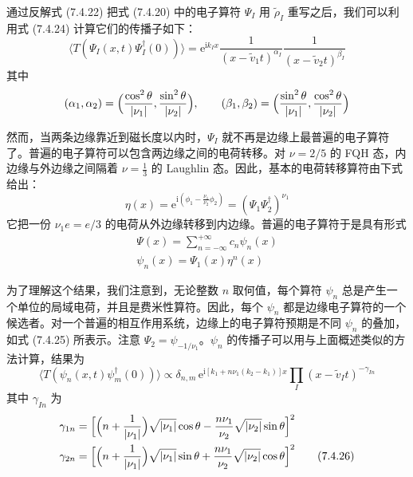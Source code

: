 通过反解式 (7.4.22) 把式 (7.4.20) 中的电子算符 $\Psi_I$ 用 $\tilde{\rho}_I$ 重写之后，我们可以利用式 (7.4.24) 计算它们的传播子如下：
\begin{equation*}
\langle T(\Psi_I(x,t)\Psi_I^\dagger(0))\rangle=\mathrm{e}^{\mathrm{i}k_Ix}\frac{1}{(x-\tilde{v}_1t)^{\alpha_I}}\frac{1}{(x-\tilde{v}_2t)^{\beta_I}}
\end{equation*}
其中
\begin{equation*}
(\alpha_1,\alpha_2)=\Bigl(\frac{\cos^2\theta}{|\nu_1|},\frac{\sin^2\theta}{|\nu_2|}\Bigr),\qquad
(\beta_1,\beta_2)=\Bigl(\frac{\sin^2\theta}{|\nu_1|},\frac{\cos^2\theta}{|\nu_2|}\Bigr)
\end{equation*}

然而，当两条边缘靠近到磁长度以内时，$\Psi_I$ 就不再是边缘上最普遍的电子算符了。普遍的电子算符可以包含两边缘之间的电荷转移。对 $\nu=2/5$ 的 FQH 态，内边缘与外边缘之间隔着 $\nu=\frac{1}{3}$ 的 Laughlin 态。因此，基本的电荷转移算符由下式给出：
\begin{equation*}
\eta(x)=\mathrm{e}^{\mathrm{i}(\phi_1-\frac{\nu_1}{\nu_2}\phi_2)}=(\Psi_1\Psi_2^\dagger)^{\nu_1}
\end{equation*}
它把一份 $\nu_1e=e/3$ 的电荷从外边缘转移到内边缘。普遍的电子算符于是具有形式
\begin{equation*}
\begin{gathered}
\Psi(x)=\sum_{n=-\infty}^{+\infty}c_n\psi_n(x)\\
\psi_n(x)=\Psi_1(x)\eta^n(x)
\end{gathered}
\tag{7.4.25}
\end{equation*}

为了理解这个结果，我们注意到，无论整数 $n$ 取何值，每个算符 $\psi_n$ 总是产生一个单位的局域电荷，并且是费米性算符。因此，每个 $\psi_n$ 都是边缘电子算符的一个候选者。对一个普遍的相互作用系统，边缘上的电子算符预期是不同 $\psi_n$ 的叠加，如式 (7.4.25) 所表示。注意 $\Psi_2=\psi_{-1/\nu_1}$。$\psi_n$ 的传播子可以用与上面概述类似的方法计算，结果为
\begin{equation*}
\langle T(\psi_n(x,t)\psi_m^\dagger(0))\rangle\propto\delta_{n,m}\,\mathrm{e}^{\mathrm{i}[k_1+n\nu_1(k_2-k_1)]x}\prod_I(x-\tilde{v}_It)^{-\gamma_{In}}
\end{equation*}
其中 $\gamma_{In}$ 为
\begin{align*}
\gamma_{1n}&=\Bigl[\Bigl(n+\frac{1}{|\nu_1|}\Bigr)\sqrt{|\nu_1|}\cos\theta-\frac{n\nu_1}{\nu_2}\sqrt{|\nu_2|}\sin\theta\Bigr]^2\\
\gamma_{2n}&=\Bigl[\Bigl(n+\frac{1}{|\nu_1|}\Bigr)\sqrt{|\nu_1|}\sin\theta+\frac{n\nu_1}{\nu_2}\sqrt{|\nu_2|}\cos\theta\Bigr]^2
\tag{7.4.26}
\end{align*}

